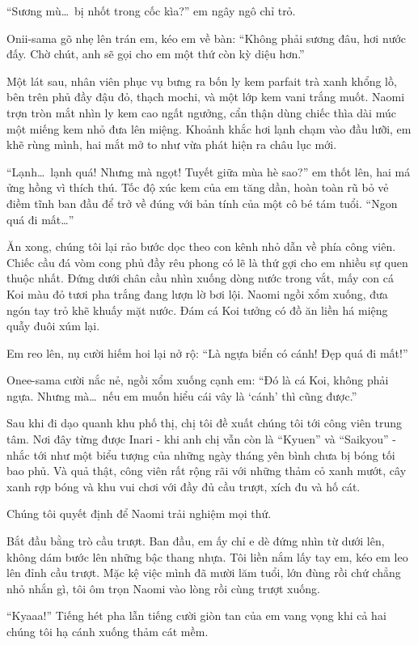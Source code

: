 \documentclass[../main.tex]{subfiles}
\begin{document}
``Sương mù\dots\ bị nhốt trong cốc kìa?'' em ngây ngô chỉ trỏ.

Onii-sama gõ nhẹ lên trán em, kéo em về bàn: ``Không phải sương đâu, hơi nước đấy. Chờ chút, anh sẽ gọi cho em một thứ còn kỳ diệu hơn.''

Một lát sau, nhân viên phục vụ bưng ra bốn ly kem parfait trà xanh khổng lồ, bên trên phủ đầy đậu đỏ, thạch mochi, và một lớp kem vani trắng muốt. Naomi trợn tròn mắt nhìn ly kem cao ngất ngưởng, cẩn thận dùng chiếc thìa dài múc một miếng kem nhỏ đưa lên miệng. Khoảnh khắc hơi lạnh chạm vào đầu lưỡi, em khẽ rùng mình, hai mắt mở to như vừa phát hiện ra châu lục mới.

``Lạnh\dots\ lạnh quá! Nhưng mà ngọt! Tuyết giữa mùa hè sao?'' em thốt lên, hai má ửng hồng vì thích thú. Tốc độ xúc kem của em tăng dần, hoàn toàn rũ bỏ vẻ điềm tĩnh ban đầu để trở về đúng với bản tính của một cô bé tám tuổi. ``Ngon quá đi mất\dots''

Ăn xong, chúng tôi lại rảo bước dọc theo con kênh nhỏ dẫn về phía công viên. Chiếc cầu đá vòm cong phủ đầy rêu phong có lẽ là thứ gợi cho em nhiều sự quen thuộc nhất. Đứng dưới chân cầu nhìn xuống dòng nước trong vắt, mấy con cá Koi màu đỏ tươi pha trắng đang lượn lờ bơi lội. Naomi ngồi xổm xuống, đưa ngón tay trỏ khẽ khuấy mặt nước. Đám cá Koi tưởng có đồ ăn liền há miệng quẫy đuôi xúm lại.

Em reo lên, nụ cười hiếm hoi lại nở rộ: ``Là ngựa biển có cánh! Đẹp quá đi mất!''

Onee-sama cười nắc nẻ, ngồi xổm xuống cạnh em: ``Đó là cá Koi, không phải ngựa. Nhưng mà\dots\ nếu em muốn hiểu cái vây là `cánh' thì cũng được.''

Sau khi đi dạo quanh khu phố thị, chị tôi đề xuất chúng tôi tới công viên trung tâm. Nơi đây từng được Inari - khi anh chị vẫn còn là ``Kyuen'' và ``Saikyou'' - nhắc tới như một biểu tượng của những ngày tháng yên bình chưa bị bóng tối bao phủ. Và quả thật, công viên rất rộng rãi với những thảm cỏ xanh mướt, cây xanh rợp bóng và khu vui chơi với đầy đủ cầu trượt, xích đu và hố cát.

Chúng tôi quyết định để Naomi trải nghiệm mọi thứ.

Bắt đầu bằng trò cầu trượt. Ban đầu, em ấy chỉ e dè đứng nhìn từ dưới lên, không dám bước lên những bậc thang nhựa. Tôi liền nắm lấy tay em, kéo em leo lên đỉnh cầu trượt. Mặc kệ việc mình đã mười lăm tuổi, lớn đùng rồi chứ chẳng nhỏ nhắn gì, tôi ôm trọn Naomi vào lòng rồi cùng trượt xuống.

``Kyaaa!'' Tiếng hét pha lẫn tiếng cười giòn tan của em vang vọng khi cả hai chúng tôi hạ cánh xuống thảm cát mềm.
\end{document}
